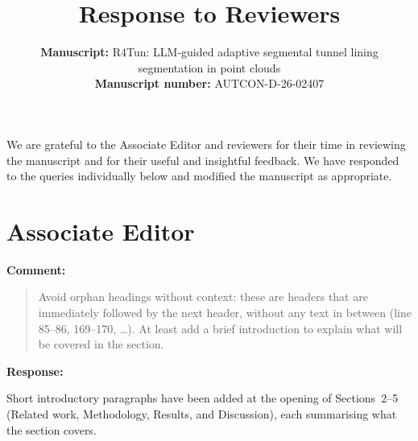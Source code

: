 \documentclass[11pt,a4paper]{article}
\title{Response to Reviewers}
\author{%
  \parbox{\textwidth}{%
    \textbf{Manuscript:} R4Tun: LLM-guided adaptive segmental tunnel lining segmentation in point clouds\\[0.4em]
    \textbf{Manuscript number:} AUTCON-D-26-02407
  }%
}
\date{}
\newenvironment{commentblock}{%
  \par\smallskip\noindent\textbf{Comment:}\par
  \begin{quote}\itshape\color{black}
}{%
  \end{quote}\smallskip
}
\newenvironment{responseblock}{%
  \par\smallskip\noindent\textbf{Response:}\par
  \begingroup\color{responsegreen}
}{%
  \endgroup\smallskip
}
\begin{document}
\maketitle

We are grateful to the Associate Editor and reviewers for their time in reviewing the manuscript and for their useful and insightful feedback. We have responded to the queries individually below and modified the manuscript as appropriate.


\section*{Associate Editor}

\begin{commentblock}
Avoid orphan headings without context: these are headers that are immediately followed by the next header, without any text in between (line 85--86, 169--170, \ldots). At least add a brief introduction to explain what will be covered in the section.
\end{commentblock}
\begin{responseblock}
Short introductory paragraphs have been added at the opening of Sections~2--5 (Related work, Methodology, Results, and Discussion), each summarising what the section covers.
\end{responseblock}
\end{document}
